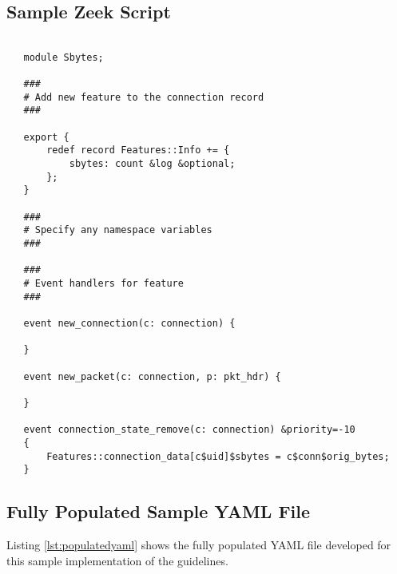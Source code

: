 \documentclass[sigconf, anonymous, screen, review]{acmart}
\begin{document}
\begin{minipage}{\linewidth}
\subsection{Sample Zeek Script}
\begin{lstlisting}[label=lst:zeeksamplescript, caption={
    A sample Zeek script that creates the single feature for source bytes.
    This script would be identified in a $\_\_load\_\_.zeek$ file and executed using the Zeek wrapper script provided by our sample implementation.
    Each script provides the feature name and implements supported Zeek callback functions.
    While we provide a default set of callbacks, others could  be added to this file if needed.
    One can see that breaking up the features into their own code unit makes understanding how they are generated straightforward.
    }, captionpos=b, basicstyle=\small, backgroundcolor=\color{gray!10!white}, frame=stb, breaklines=True]

   module Sbytes;
   
   ###
   # Add new feature to the connection record
   ###
   
   export {
       redef record Features::Info += {
           sbytes: count &log &optional;
       };
   }
   
   ###
   # Specify any namespace variables
   ###
   
   ###
   # Event handlers for feature
   ###
   
   event new_connection(c: connection) {
   
   }
   
   event new_packet(c: connection, p: pkt_hdr) {
   
   }
   
   event connection_state_remove(c: connection) &priority=-10
   {
       Features::connection_data[c$uid]$sbytes = c$conn$orig_bytes;
   }
\end{lstlisting}
\end{minipage}


\subsection{Fully Populated Sample YAML File}
Listing \ref{lst:populatedyaml} shows the fully populated YAML file developed for this sample implementation of the guidelines.
\end{document}
